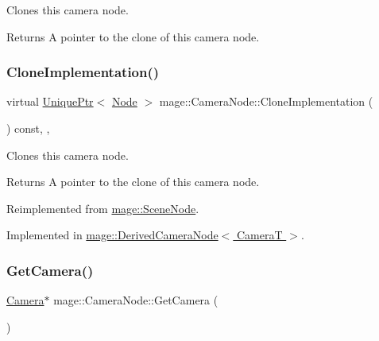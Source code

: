 Clones this camera node.

\begin{DoxyReturn}{Returns}
A pointer to the clone of this camera node. 
\end{DoxyReturn}
\hypertarget{classmage_1_1_camera_node_a002d3a2b41cda270a26ca5d8f3a17f55}{}\label{classmage_1_1_camera_node_a002d3a2b41cda270a26ca5d8f3a17f55} 
\subsubsection{\texorpdfstring{Clone\+Implementation()}{CloneImplementation()}}
{\footnotesize\ttfamily virtual \hyperlink{namespacemage_a3316d7143a973e37adf1110f2e80ca31}{Unique\+Ptr}$<$ \hyperlink{classmage_1_1_node}{Node} $>$ mage\+::\+Camera\+Node\+::\+Clone\+Implementation (\begin{DoxyParamCaption}{ }\end{DoxyParamCaption}) const\hspace{0.3cm}{\ttfamily [override]}, {\ttfamily [private]}, {}}

Clones this camera node.

\begin{DoxyReturn}{Returns}
A pointer to the clone of this camera node. 
\end{DoxyReturn}


Reimplemented from \hyperlink{classmage_1_1_scene_node_a42d0d53ab804d38ebd584d2de6490eeb}{mage\+::\+Scene\+Node}.



Implemented in \hyperlink{classmage_1_1_derived_camera_node_aa965751029ebd6b41d3805b499a8304e}{mage\+::\+Derived\+Camera\+Node$<$ Camera\+T $>$}.

\hypertarget{classmage_1_1_camera_node_aa9887e3bf192d6c078aae2430732cbf8}{}\label{classmage_1_1_camera_node_aa9887e3bf192d6c078aae2430732cbf8} 
\subsubsection{\texorpdfstring{Get\+Camera()}{GetCamera()}\hspace{0.1cm}{\footnotesize\ttfamily [1/2]}}
{\footnotesize\ttfamily \hyperlink{classmage_1_1_camera}{Camera}$\ast$ mage\+::\+Camera\+Node\+::\+Get\+Camera (\begin{DoxyParamCaption}{ }\end{DoxyParamCaption})\hspace{0.3cm}{\ttfamily [noexcept]}}

